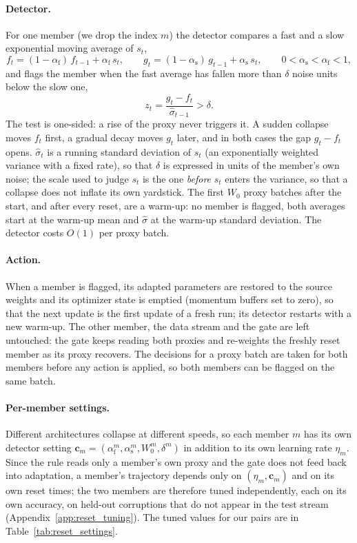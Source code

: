 \paragraph{Detector.}
For one member (we drop the index $m$) the detector compares a fast and a slow exponential moving average of $s_t$,
\begin{equation}
  f_t = (1-\alpha_{\mathrm{f}})\, f_{t-1} + \alpha_{\mathrm{f}}\, s_t, \qquad
  g_t = (1-\alpha_{\mathrm{s}})\, g_{t-1} + \alpha_{\mathrm{s}}\, s_t, \qquad 0 < \alpha_{\mathrm{s}} < \alpha_{\mathrm{f}} < 1,
\end{equation}
and flags the member when the fast average has fallen more than $\delta$ noise units below the slow one,
\begin{equation}
  z_t = \frac{g_t - f_t}{\hat\sigma_{t-1}} > \delta .
\end{equation}
The test is one-sided: a rise of the proxy never triggers it. A sudden collapse moves $f_t$ first, a gradual decay moves $g_t$ later, and in both cases the gap
$g_t - f_t$ opens. $\hat\sigma_t$ is a running standard deviation of $s_t$ (an exponentially weighted variance with a fixed rate), so that $\delta$ is expressed in units of the
member's own noise; the scale used to judge $s_t$ is the one \emph{before} $s_t$ enters the variance, so that a collapse does not inflate its own yardstick.
The first $W_0$ proxy batches after the start, and after every reset, are a warm-up: no member is flagged, both averages start at the warm-up mean and $\hat\sigma$ at the warm-up
standard deviation. The detector costs $O(1)$ per proxy batch.

\paragraph{Action.}
When a member is flagged, its adapted parameters are restored to the source weights and its optimizer state is emptied (momentum buffers set to zero), so that the next
update is the first update of a fresh run; its detector restarts with a new warm-up. The other member, the data stream and the gate are left untouched: the gate keeps
reading both proxies and re-weights the freshly reset member as its proxy recovers. The decisions for a proxy batch are taken for both members before any action is applied,
so both members can be flagged on the same batch.

\paragraph{Per-member settings.}
Different architectures collapse at different speeds, so each member $m$ has its own detector setting
$\mathbf{c}_m = (\alpha_{\mathrm{f}}^{m}, \alpha_{\mathrm{s}}^{m}, W_0^{m}, \delta^{m})$ in addition to its own learning rate $\eta_m$.
Since the rule reads only a member's own proxy and the gate does not feed back into adaptation, a member's trajectory depends only on $(\eta_m, \mathbf{c}_m)$ and on its own
reset times; the two members are therefore tuned independently, each on its own accuracy, on held-out corruptions that do not appear in the test stream
(Appendix~\ref{app:reset_tuning}). The tuned values for our pairs are in Table~\ref{tab:reset_settings}.

